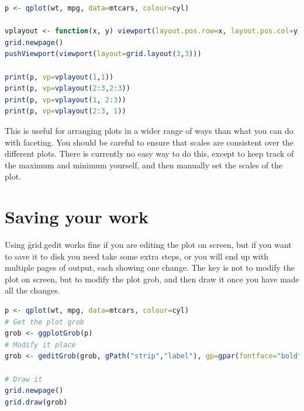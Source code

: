 \begin{lstlisting}[language = R]
p <- qplot(wt, mpg, data=mtcars, colour=cyl)

vplayout <- function(x, y) viewport(layout.pos.row=x, layout.pos.col=y)
grid.newpage()
pushViewport(viewport(layout=grid.layout(3,3)))

print(p, vp=vplayout(1,1))
print(p, vp=vplayout(2:3,2:3))
print(p, vp=vplayout(1, 2:3))
print(p, vp=vplayout(2:3, 1))
\end{lstlisting}

This is useful for arranging plots in a wider range of ways than what you can do with faceting.   You should be careful to ensure that scales are consistent over the different plots.  There is currently no easy way to do this, except to keep track of the maximum and minimum yourself, and then manually set the scales of the plot.

\section{Saving your work} 
\label{sec:grid-save}

Using \f{grid.gedit} works fine if you are editing the plot on screen, but if you want to save it to disk you need take some extra steps, or you will end up with multiple pages of output, each showing one change.  The key is not to modify the plot on screen, but to modify the plot grob, and then draw it once you have made all the changes.  

\begin{lstlisting}[language = R]
p <- qplot(wt, mpg, data=mtcars, colour=cyl)
# Get the plot grob
grob <- ggplotGrob(p)
# Modify it place
grob <- geditGrob(grob, gPath("strip","label"), gp=gpar(fontface="bold"))

# Draw it
grid.newpage()
grid.draw(grob)
\end{lstlisting}



